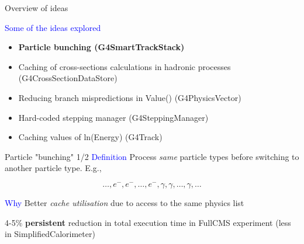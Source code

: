 \documentclass{beamer}
\begin{document}
\begin{frame}{Overview of ideas}

\textcolor{blue}{Some of the ideas explored}
\begin{itemize}
  \item {\bf Particle bunching (G4SmartTrackStack) }
  \item Caching of cross-sections calculations in hadronic processes (G4CrossSectionDataStore)  
  \item Reducing branch mispredictions in Value() (G4PhysicsVector)
  \item Hard-coded stepping manager (G4SteppingManager)  
  \item Caching values of ln(Energy) (G4Track)
\end{itemize}
\end{frame}

\begin{frame}{Particle "bunching" 1/2}
\textcolor{blue}{Definition}
Process \textit{same} particle types before switching to another particle type. E.g.,

\begin{equation*}
\ldots, e^-, e^-, \ldots, e^-, \gamma, \gamma, \ldots, \gamma, \ldots
\end{equation*}

\textcolor{blue}{Why} Better \textit{cache utilisation} due to access to the
same physics list

\vspace{5 mm}

4-5\% {\bf persistent} reduction in total execution time in FullCMS experiment (less in SimplifiedCalorimeter)

\end{frame}
\end{document}
